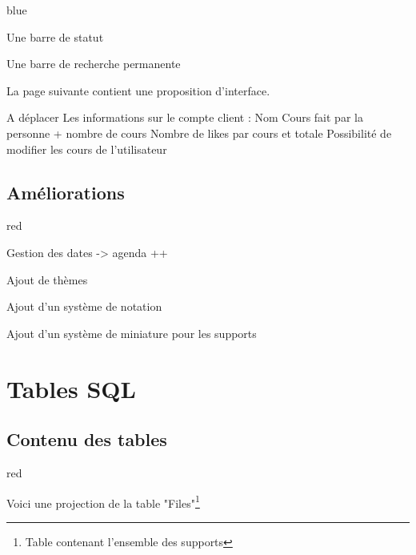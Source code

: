 {\begin{items}{blue}{\Triangle}
 \item Une barre de statut
 \item Une barre de recherche permanente
\end{items}

La page suivante contient une proposition d'interface.

A déplacer
Les informations sur le compte client :
Nom
Cours fait par la personne + nombre de cours
Nombre de likes par cours et totale
Possibilité de modifier les cours de l'utilisateur

\section{Améliorations}


\begin{items}{red}{\Triangle}
\item Gestion des dates ->  agenda ++
\item Ajout de thèmes
\item Ajout d'un système de notation
\item Ajout d'un système de miniature pour les supports
\end{items}







\chapter{Tables SQL}

\section{Contenu des tables}

\begin{items}{red}{\Triangle}

\item Voici une projection de la table "Files"\footnote{Table contenant l'ensemble des supports}


\end{items}}
